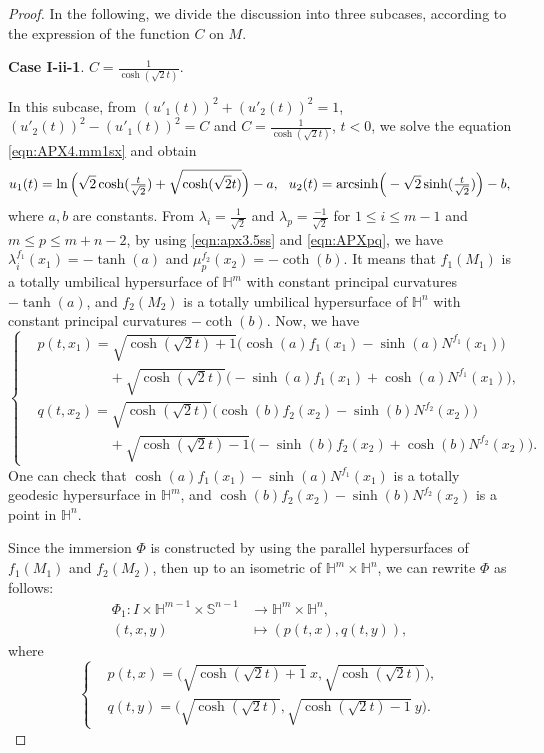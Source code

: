 \documentclass[reqno]{amsart}%
\theoremstyle{definition}
\numberwithin{equation}{section}
\begin{document}
\begin{proof}
In the following, we divide the discussion into three subcases, according to the expression of the function $C$ on $M$. 

{\bf Case I-ii-1}. $C=\frac{1}{\cosh(\sqrt{2}t)}$. 

In this subcase, from $(u'_{1}(t))^2+(u'_{2}(t))^2=1$, $(u'_{2}(t))^2-(u'_{1}(t))^2=C$ and $C=\frac{1}{\cosh(\sqrt{2}t)}$, $t<0$, we solve the equation \eqref{eqn:APX4.mm1sx} and obtain 
\begin{equation}\label{eqn:APXpq}
	\begin{aligned}
		u_1(t)=\ln\Big(\sqrt{2}\cosh(\tfrac{t}{\sqrt{2}})+\sqrt{\cosh(\sqrt{2}t)}\Big)-a,\ \
		u_2(t)={\rm arcsinh}\Big(-\sqrt{2}\sinh(\tfrac{t}{\sqrt{2}})\Big)-b, 
	\end{aligned}
\end{equation}
where $a,b$ are constants. 
From $\lambda_i=\frac{1}{\sqrt{2}}$ and $\lambda_p=\frac{-1}{\sqrt{2}}$ for $1\leq i\leq m-1$ and $m\leq p\leq m+n-2$, by using \eqref{eqn:apx3.5ss} and \eqref{eqn:APXpq}, we have 
$\lambda^{f_1}_i(x_1)=-\tanh(a)$ and $\mu^{f_2}_p(x_2)=-\coth(b)$. It means that 
$f_1(M_1)$ is a totally umbilical hypersurface of 
$\mathbb{H}^m$ with constant principal curvatures $-\tanh(a)$, and $f_2(M_2)$ is a totally umbilical hypersurface of 
$\mathbb{H}^n$ with constant principal curvatures $-\coth(b)$. 
Now, we have 
$$
\left\{
\begin{aligned}
	&p(t,x_1)=\sqrt{\cosh(\sqrt{2}t)+1}\big(\cosh(a)f_1(x_1)-\sinh(a)N^{f_1}(x_1)\big)\\
&\ \ \ \ \ \ \ \ \ \ \ \ \ \ \ \ \ \ \ \ \ \ \ +\sqrt{\cosh(\sqrt{2}t)}\big(-\sinh(a)f_1(x_1)+\cosh(a)N^{f_1}(x_1)\big),\\
	&q(t,x_2)=\sqrt{\cosh(\sqrt{2}t)}\big(\cosh(b)f_2(x_2)-\sinh(b)N^{f_2}(x_2)\big)\\
	&\ \ \ \ \ \ \ \ \ \ \ \ \ \ \ \ \ \ \ \ \ \ \
	+\sqrt{\cosh(\sqrt{2}t)-1}\big(-\sinh(b)f_2(x_2)+\cosh(b)N^{f_2}(x_2)\big).
\end{aligned}\right.
$$
One can check that $\cosh(a)f_1(x_1)-\sinh(a)N^{f_1}(x_1)$ is a totally geodesic hypersurface in $\mathbb{H}^{m}$, and $\cosh(b)f_2(x_2)-\sinh(b)N^{f_2}(x_2)$ is a point in $\mathbb{H}^{n}$. 

Since the immersion $\Phi$ is constructed by using the parallel hypersurfaces of $f_1(M_1)$ and $f_2(M_2)$,  
then up to an isometric of $\mathbb{H}^m\times \mathbb{H}^n$, we can rewrite $\Phi$ as follows:  
\begin{equation}\label{eqn:ap3.1ss}
	\begin{aligned}
		\Phi_1:I\times \mathbb{H}^{m-1}\times \mathbb{S}^{n-1}&\longrightarrow \mathbb{H}^m\times \mathbb{H}^n,\\
		(t,x,y)&\longmapsto (p(t,x),q(t,y)),
	\end{aligned}
\end{equation}
%
where
%
$$
\left\{\begin{aligned}
	&p(t,x)=\Big(\sqrt{\cosh(\sqrt{2}t)+1}\ x,\sqrt{\cosh(\sqrt{2}t)}\Big),\\
	&q(t,y)=\Big(\sqrt{\cosh(\sqrt{2}t)},\sqrt{\cosh(\sqrt{2}t)-1}\ y\Big).
\end{aligned}\right.
$$




\end{proof}
\end{document}
